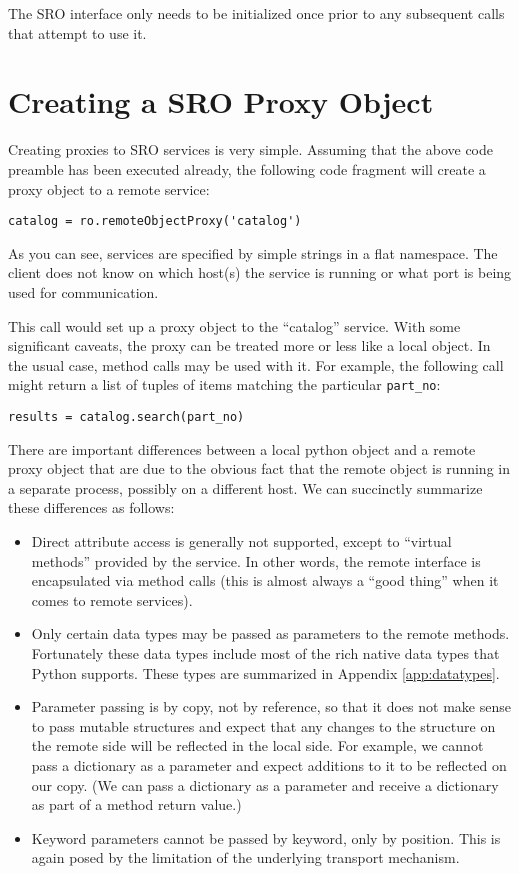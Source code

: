 \documentclass[11pt]{report}
\begin{document}
The SRO interface only needs to be initialized once prior to any
subsequent calls that attempt to use it.

\section{Creating a SRO Proxy Object}
Creating proxies to SRO services is very simple.  Assuming that the
above code preamble has been executed already, the following code
fragment will create a proxy object to a remote service:
\begin{verbatim}
catalog = ro.remoteObjectProxy('catalog')
\end{verbatim}
As you can see, services are specified by simple strings in a flat
namespace.  The client does not know on which host(s) the service is running
or what port is being used for communication.

This call would set up a proxy object to the ``catalog'' service.
With some significant caveats, the proxy can be treated more or less like a
local object.  In the usual case, method calls may be used with it.
For example, the following call might return a list of tuples of
items matching the particular {\tt part\_no}:
\begin{verbatim}
results = catalog.search(part_no)
\end{verbatim}
There are important differences between a local python object and a
remote proxy object that are due to the obvious fact that the remote
object is running in a separate process, possibly on a different host. 
We can succinctly summarize these differences as follows:
\begin{itemize}
\item Direct attribute access is generally not supported, except to
  ``virtual methods'' provided by the service.  In other words, the
  remote interface is encapsulated via method calls (this is almost
  always a ``good thing'' when it comes to remote services).
\item Only certain data types may be passed as parameters to the remote
  methods.  Fortunately these data types include most of the rich native
  data types that Python supports.  These types are summarized in
  Appendix \ref{app:datatypes}. 
\item Parameter passing is by copy, not by reference, so that it does
  not make sense to pass mutable structures and expect that any changes
  to the structure on the remote side will be reflected in the local
  side.  For example, we cannot pass a dictionary as a parameter and
  expect additions to it to be reflected on our copy.  (We can pass a
  dictionary as a parameter and receive a dictionary as part of a method
  return value.)
\item Keyword parameters cannot be passed by keyword, only by position.
  This is again posed by the limitation of the underlying transport
  mechanism. 
\end{itemize}
\end{document}
